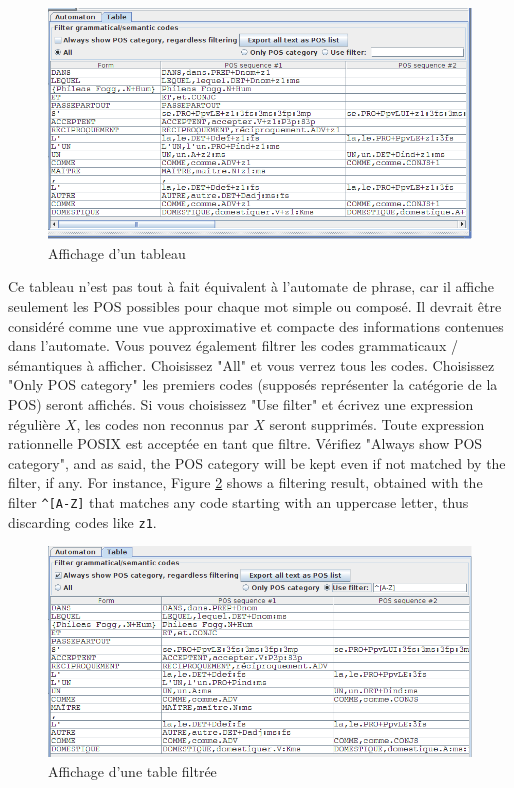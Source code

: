 \begin{figure}[!ht]
\begin{center}
\includegraphics[width=14.5cm]{resources/img/fig7-table1.png}
\caption{Affichage d'un tableau\label{fig7-table1}}
\end{center}
\end{figure}

\bigskip
\noindent Ce tableau n'est pas tout à fait équivalent à l'automate de phrase, car il affiche
seulement les POS possibles pour chaque mot simple ou composé. Il devrait être considéré comme une
vue approximative et compacte des informations contenues dans l'automate. Vous pouvez également
filtrer les codes grammaticaux / sémantiques à afficher. Choisissez "All" et vous verrez tous les
codes. Choisissez "Only POS category" les premiers codes (supposés représenter la catégorie de la
	POS) seront affichés. Si vous choisissez "Use filter" et écrivez une expression régulière $X$,
les codes non reconnus par $X$ seront supprimés. Toute expression rationnelle POSIX est acceptée en
tant que filtre.
Vérifiez  "Always show POS category", and as said, the POS category will be kept even if not matched by the filter, if any. For instance, Figure \ref{fig7-table2} shows a filtering result, obtained with the filter \verb+^[A-Z]+ that matches any code starting with an uppercase letter, thus discarding codes like \verb+z1+.

\begin{figure}[!ht]
\begin{center}
\includegraphics[width=14.5cm]{resources/img/fig7-table2.png}
\caption{Affichage d'une table filtrée\label{fig7-table2}}
\end{center}
\end{figure}
      
